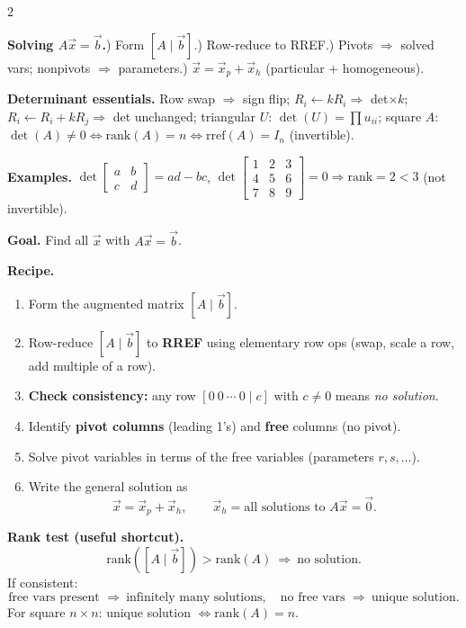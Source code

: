 \documentclass[8pt]{extarticle}
\begin{document}
\begin{multicols}{2}
\begin{tcolorbox}[title={Quick Reference -- Matrix Operations, Rank, Determinant \& Solving $A\vec{x}=\vec{b}$}, colframe=black!60!white, colback=gray!2, fontupper=\tiny]
\textbf{Solving \(A\vec{x}=\vec{b}\).}) Form \([A\mid \vec b]\).) Row-reduce to RREF.) Pivots \(\Rightarrow\) solved vars; nonpivots \(\Rightarrow\) parameters.) \(\vec x=\vec x_p+\vec x_h\) (particular + homogeneous).

\textbf{Determinant essentials.}\;
Row swap \(\Rightarrow\) sign flip;\;
\(R_i\gets kR_i\Rightarrow\) det\(\times k\);\;
\(R_i\gets R_i+kR_j\Rightarrow\) det unchanged;\;
triangular \(U\): \(\det(U)=\prod u_{ii}\);\;
square \(A\): \(\det(A)\neq0\Leftrightarrow \mathrm{rank}(A)=n\Leftrightarrow \text{rref}(A)=I_n\) (invertible).

\textbf{Examples.}\;
\(\det\!\begin{bmatrix}a&b\\ c&d\end{bmatrix}=ad-bc\),\quad
\(\det\!\begin{bmatrix}1&2&3\\ 4&5&6\\ 7&8&9\end{bmatrix}=0\Rightarrow \mathrm{rank}=2<3\) (not invertible).
\endgroup
\end{tcolorbox}
\begin{tcolorbox}[title={How to Solve $A\vec{x}=\vec{b}$ (Step-by-step)}, colframe=black!60!white, colback=gray!2]
\scriptsize
\textbf{Goal.} Find all $\vec{x}$ with $A\vec{x}=\vec{b}$.

\textbf{Recipe.}
\begin{enumerate}[leftmargin=1.1em,itemsep=1pt]
\item Form the augmented matrix $[A\mid \vec{b}]$.
\item Row-reduce $[A\mid \vec{b}]$ to \textbf{RREF} using elementary row ops (swap, scale a row, add multiple of a row).
\item \textbf{Check consistency:} any row $[0\ 0\ \cdots\ 0\mid c]$ with $c\neq0$ means \emph{no solution}.
\item Identify \textbf{pivot columns} (leading 1’s) and \textbf{free} columns (no pivot).
\item Solve pivot variables in terms of the free variables (parameters $r,s,\ldots$).
\item Write the general solution as
\[
\vec{x}=\vec{x}_p+\vec{x}_h,\qquad
\vec{x}_h=\text{all solutions to }A\vec{x}=\vec{0}.
\]
\end{enumerate}

\textbf{Rank test (useful shortcut).}
\[
\mathrm{rank}([A\mid\vec{b}])>\mathrm{rank}(A)\ \Rightarrow\ \text{no solution}.
\]
If consistent:
\[
\text{free vars present }\Rightarrow\ \text{infinitely many solutions},\quad
\text{no free vars }\Rightarrow\ \text{unique solution}.
\]
For square $n\times n$: unique solution $\Leftrightarrow \mathrm{rank}(A)=n$.


\end{tcolorbox}
\end{multicols}
\end{document}
